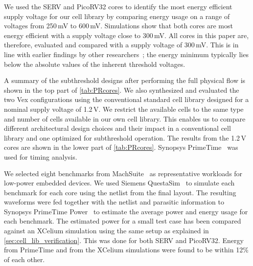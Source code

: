 We used the SERV and PicoRV32 cores to identify the most energy efficient supply voltage for our cell library by comparing energy usage on a range of voltages from 250\,mV to 600\,mV.  Simulations show that both cores are most energy efficient with a supply voltage close to 300\,mV. 
All cores in this paper are, therefore, evaluated and compared with a supply voltage of 300\,mV. 
This is in line with earlier findings by other researchers~\cite{liu1993trading, wang2006sub}; the energy minimum typically lies below the absolute values of the inherent threshold voltages.

A summary of the subthreshold designs after performing the full physical flow is shown in the top part of \autoref{tab:PRcores}.
We also synthesized and evaluated the two Vex configurations using the conventional standard cell library designed for a nominal supply voltage of 1.2\,V.
We restrict the available cells to the same type and number of cells available in our own cell library.
This enables us to compare different architectural design choices and their impact in a conventional cell library and one optimized for subthreshold operation.
The results from the 1.2\,V cores are shown in the lower part of \autoref{tab:PRcores}.  Synopsys PrimeTime~\cite{primetime} %
was used for timing analysis.  

We selected eight benchmarks from MachSuite~\cite{machsuite:IISWC2014} as representative workloads for low-power embedded devices.
We used Siemens QuestaSim~\cite{questa}
to simulate each benchmark for each core using the netlist from the final layout.
The resulting waveforms were fed together with the netlist and parasitic information to Synopsys PrimeTime Power~\cite{primetime}
to estimate the average power and energy usage for each benchmark.
The estimated power for a small test case has been compared against an XCelium simulation using the same setup as explained in \autoref{sec:cell_lib_verification}.
This was done for both SERV and PicoRV32.  Energy from PrimeTime and from the XCelium simulations were found to be within 12\% of each other.
